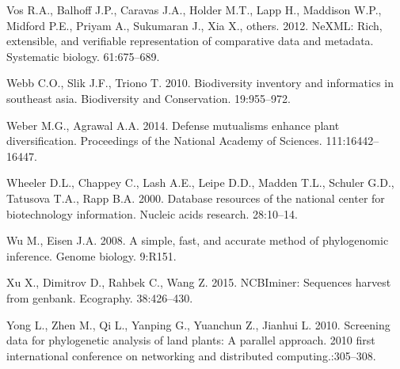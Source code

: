 \documentclass[]{article}
\begin{document}
\leavevmode\hypertarget{ref-vos2012nexml}{}%
Vos R.A., Balhoff J.P., Caravas J.A., Holder M.T., Lapp H., Maddison W.P., Midford P.E., Priyam A., Sukumaran J., Xia X., others. 2012. NeXML: Rich, extensible, and verifiable representation of comparative data and metadata. Systematic biology. 61:675--689.

\leavevmode\hypertarget{ref-webb2010biodiversity}{}%
Webb C.O., Slik J.F., Triono T. 2010. Biodiversity inventory and informatics in southeast asia. Biodiversity and Conservation. 19:955--972.

\leavevmode\hypertarget{ref-weber2014defense}{}%
Weber M.G., Agrawal A.A. 2014. Defense mutualisms enhance plant diversification. Proceedings of the National Academy of Sciences. 111:16442--16447.

\leavevmode\hypertarget{ref-wheeler2000database}{}%
Wheeler D.L., Chappey C., Lash A.E., Leipe D.D., Madden T.L., Schuler G.D., Tatusova T.A., Rapp B.A. 2000. Database resources of the national center for biotechnology information. Nucleic acids research. 28:10--14.

\leavevmode\hypertarget{ref-wu2008simple}{}%
Wu M., Eisen J.A. 2008. A simple, fast, and accurate method of phylogenomic inference. Genome biology. 9:R151.

\leavevmode\hypertarget{ref-xu2015ncbiminer}{}%
Xu X., Dimitrov D., Rahbek C., Wang Z. 2015. NCBIminer: Sequences harvest from genbank. Ecography. 38:426--430.

\leavevmode\hypertarget{ref-yong2010screening}{}%
Yong L., Zhen M., Qi L., Yanping G., Yuanchun Z., Jianhui L. 2010. Screening data for phylogenetic analysis of land plants: A parallel approach. 2010 first international conference on networking and distributed computing.:305--308.
\end{document}
